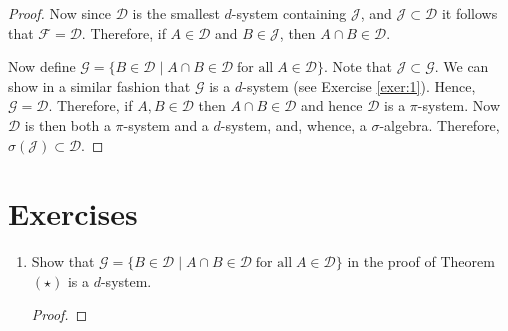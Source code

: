 \documentclass{article}
\newcommand{\D}{\ensuremath{\mathcal D}}
\newcommand{\F}{\ensuremath{\mathcal F}}
\newcommand{\J}{\ensuremath{\mathcal J}}
\newcommand{\G}{\ensuremath{\mathcal G}}
\begin{document}
\begin{proof}
Now since $\D$ is the smallest $d$-system containing $\J$, and $\J\subset\D$ it follows that $\F=\D$. Therefore, if $A\in\D$ and $B\in\J$, then $A\cap B\in\D$.

Now define $\G=\{B\in\D\mid A\cap B\in\D\; \text{for all}\; A\in\D  \}$. Note that $\J\subset\G$. We can show in a similar fashion that $\G$ is a $d$-system (see Exercise \ref{exer:1}). Hence, $\G=\D$. Therefore, if $A,B\in\D$ then $A\cap B\in\D$ and hence $\D$ is a $\pi$-system. Now $\D$ is then both a $\pi$-system and a $d$-system, and, whence, a $\sigma$-algebra. Therefore, $\sigma(\J)\subset\D$.
\end{proof}

\section*{Exercises}

\begin{enumerate}
\item\label{exer:1} Show that $\G=\{B\in\D\mid A\cap B\in\D\; \text{for all}\; A\in\D  \}$ in the proof of Theorem $(\star)$ is a $d$-system.

\begin{proof}
\end{proof}

\end{enumerate}
\end{document}
